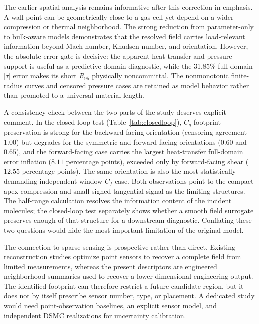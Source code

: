 \documentclass[aip,pof,preprint,notitlepage,floatfix,amsmath,amssymb]{revtex4-2}
\begin{document}
The earlier spatial analysis remains informative after this correction in emphasis. A wall point can be geometrically close to a gas cell yet depend on a wider compression or thermal neighborhood. The strong reduction from parameter-only to bulk-aware models demonstrates that the resolved field carries load-relevant information beyond Mach number, Knudsen number, and orientation. However, the absolute-error gate is decisive: the apparent heat-transfer and pressure support is useful as a predictive-domain diagnostic, while the 31.85\% full-domain $|\tau|$ error makes its short $R_{95}$ physically noncommittal. The nonmonotonic finite-radius curves and censored pressure cases are retained as model behavior rather than promoted to a universal material length.

A consistency check between the two parts of the study deserves explicit comment. In the closed-loop test (Table~\ref{tab:closedloop}), $C_q$ footprint preservation is strong for the backward-facing orientation (censoring agreement $1.00$) but degrades for the symmetric and forward-facing orientations ($0.60$ and $0.65$), and the forward-facing case carries the largest heat-transfer full-domain error inflation ($8.11$ percentage points), exceeded only by forward-facing shear ($12.55$ percentage points). The same orientation is also the most statistically demanding independent-window $C_f$ case. Both observations point to the compact apex compression and small signed tangential signal as the limiting structures. The half-range calculation resolves the information content of the incident molecules; the closed-loop test separately shows whether a smooth field surrogate preserves enough of that structure for a downstream diagnostic. Conflating these two questions would hide the most important limitation of the original model.

The connection to sparse sensing is prospective rather than direct. Existing reconstruction studies optimize point sensors to recover a complete field from limited measurements, whereas the present descriptors are engineered neighborhood summaries used to recover a lower-dimensional engineering output.\cite{Manohar2018,Fukami2021Sparse,Santos2023Senseiver,Williams2024SHRED,Kong2025CrossAttention,Wang2025Generative,Zhang2026Sparse,Liang2026Sensor} The identified footprint can therefore restrict a future candidate region, but it does not by itself prescribe sensor number, type, or placement. A dedicated study would need point-observation baselines, an explicit sensor model, and independent DSMC realizations for uncertainty calibration.
\end{document}
